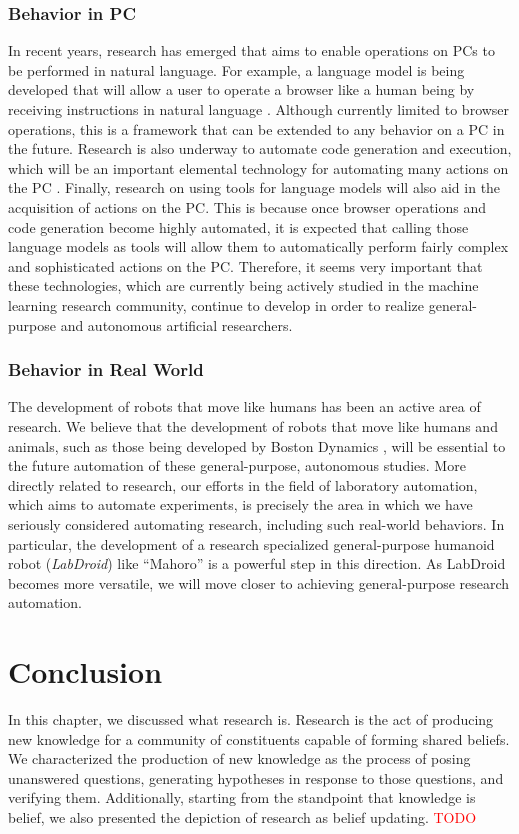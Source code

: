 \subsubsection{Behavior in PC}
In recent years, research has emerged that aims to enable operations on PCs to be performed in natural language. For example, a language model is being developed that will allow a user to operate a browser like a human being by receiving instructions in natural language \cite{nakano2021webgpt}. Although currently limited to browser operations, this is a framework that can be extended to any behavior on a PC in the future. Research is also underway to automate code generation and execution, which will be an important elemental technology for automating many actions on the PC \cite{gulwani2017program}. Finally, research on using tools for language models \cite{mialon2023augmented} will also aid in the acquisition of actions on the PC. This is because once browser operations and code generation become highly automated, it is expected that calling those language models as tools will allow them to automatically perform fairly complex and sophisticated actions on the PC. Therefore, it seems very important that these technologies, which are currently being actively studied in the machine learning research community, continue to develop in order to realize general-purpose and autonomous artificial researchers.

\subsubsection{Behavior in Real World}
The development of robots that move like humans has been an active area of research. We believe that the development of robots that move like humans and animals, such as those being developed by Boston Dynamics \cite{kuindersma2016optimization}, will be essential to the future automation of these general-purpose, autonomous studies. More directly related to research, our efforts in the field of laboratory automation, which aims to automate experiments, is precisely the area in which we have seriously considered automating research, including such real-world behaviors. In particular, the development of a research specialized general-purpose humanoid robot (\textit{LabDroid}) like ``Mahoro'' \cite{yachie2017robotic} is a powerful step in this direction. As LabDroid becomes more versatile, we will move closer to achieving general-purpose research automation.


\section{Conclusion}
In this chapter, we discussed what research is. Research is the act of producing new knowledge for a community of constituents capable of forming shared beliefs. We characterized the production of new knowledge as the process of posing unanswered questions, generating hypotheses in response to those questions, and verifying them. Additionally, starting from the standpoint that knowledge is belief, we also presented the depiction of research as belief updating.
\textcolor{red}{TODO}
